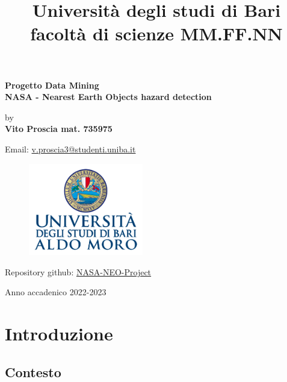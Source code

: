 \documentclass[italian,12pt,a4paper]{article}
\title{Università degli studi di Bari facoltà di scienze MM.FF.NN}
\date{} %
\begin{document}
	\maketitle
	\thispagestyle{empty}
	\begin{center}
		\huge	\textbf{Progetto Data Mining} \\
		\Large \textbf{NASA - Nearest Earth Objects hazard detection}
	\end{center}
	
	\begin{center}
		by \\
		\Large \textbf{Vito Proscia mat. 735975} \\
	\end{center}
	\vspace{4px}
	\begin{center}
		Email: \href{mailto:v.proscia3@studenti.uniba.it}{v.proscia3@studenti.uniba.it}
	\end{center}
	\vspace{50px}
	\begin{figure}[hb]
		\centering
		\includegraphics[width=5cm]{image.png}
	\end{figure}
	\vspace{50px}
	\begin{center}
		Repository github: \href{https://github.com/Giut0/NASA-NEO-Project}{NASA-NEO-Project}
	\end{center}
	
	\vfill
	\begin{center}
		Anno accadenico 2022-2023
	\end{center}
	
	\newpage
	
	\tableofcontents
	
	\newpage
	
	\section{Introduzione}

	\subsection{Contesto}
\end{document}
